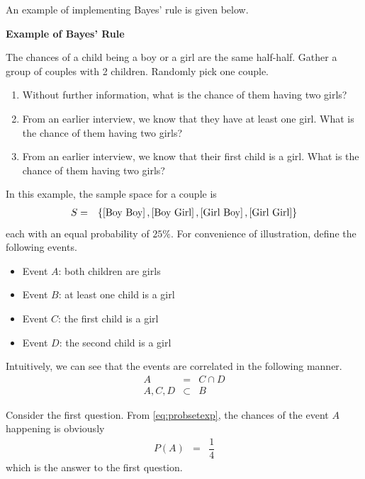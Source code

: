 An example of implementing Bayes' rule is given below.

\begin{mdframed}
\noindent \textbf{Example of Bayes' Rule}

The chances of a child being a boy or a girl are the same half-half. Gather a group of couples with 2 children. Randomly pick one couple.

\begin{enumerate}
	\item Without further information, what is the chance of them having two girls?
	\item From an earlier interview, we know that they have at least one girl. What is the chance of them having two girls?
	\item From an earlier interview, we know that their first child is a girl. What is the chance of them having two girls?
\end{enumerate}

\end{mdframed}

In this example, the sample space for a couple is 
\begin{eqnarray}
S &=& \left\{\left[\textup{Boy Boy}\right], \left[\textup{Boy Girl}\right], \left[\textup{Girl Boy}\right], \left[\textup{Girl Girl}\right]\right\} \label{eq:probsetexp}
\end{eqnarray}
each with an equal probability of $25\%$. For convenience of illustration, define the following events.
\begin{itemize}
	\item Event $A$: both children are girls
	\item Event $B$: at least one child is a girl
	\item Event $C$: the first child is a girl
	\item Event $D$: the second child is a girl
\end{itemize}

Intuitively, we can see that the events are correlated in the following manner.
\begin{eqnarray}
	A &=& C \cap D \nonumber \\
	A, C, D &\subset& B \nonumber
\end{eqnarray}

Consider the first question. From \eqref{eq:probsetexp}, the chances of the event $A$ happening is obviously
\begin{eqnarray}
P(A) &=& \dfrac{1}{4} \nonumber
\end{eqnarray}
which is the answer to the first question.

